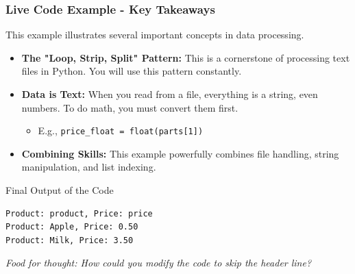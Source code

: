 \documentclass{beamer}
\begin{document}
\begin{frame}[fragile]
    \frametitle{Live Code Example - Key Takeaways}
    
    This example illustrates several important concepts in data processing.
    
    \begin{itemize}
        \item \textbf{The "Loop, Strip, Split" Pattern:} This is a cornerstone of processing text files in Python. You will use this pattern constantly.
        
        \item \textbf{Data is Text:} When you read from a file, everything is a string, even numbers. To do math, you must convert them first.
        \begin{itemize}
            \item E.g., \texttt{price\_float = float(parts[1])}
        \end{itemize}
        
        \item \textbf{Combining Skills:} This example powerfully combines file handling, string manipulation, and list indexing.
    \end{itemize}
    
    \begin{block}{Final Output of the Code}
\begin{lstlisting}
Product: product, Price: price
Product: Apple, Price: 0.50
Product: Milk, Price: 3.50
\end{lstlisting}
    \end{block}
    
    \textit{Food for thought: How could you modify the code to skip the header line?}
\end{frame}
\end{document}
